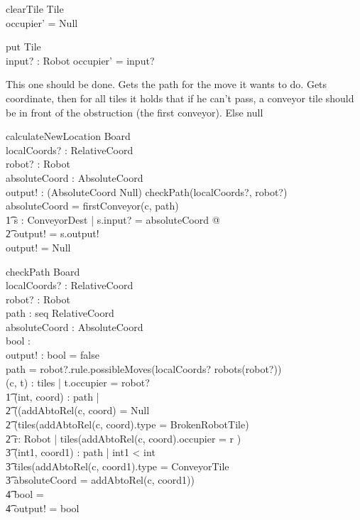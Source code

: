 \documentclass[a4paper,11pt]{article}
\begin{document}
\begin{schema}{clearTile}
\Delta Tile \\
\where
occupier' = Null
\end{schema}

\begin{schema}{put}
\Delta Tile \\
input? : Robot
\where
occupier' = input?
\end{schema}

This one should be done. Gets the path for the move it wants to do. Gets coordinate, then for all tiles it holds that if he can't pass, a conveyor tile should be in front of the obstruction (the first conveyor). Else null
\begin{schema}{calculateNewLocation}
\Xi Board \\
localCoords? : RelativeCoord \\
robot? : Robot \\
absoluteCoord : AbsoluteCoord \\
output! : (AbsoluteCoord \union Null) 
\where
\IF checkPath(localCoords?, robot?) \\
\THEN absoluteCoord = firstConveyor(c, path) \\ \t1
\exists s : ConveyorDest | s.input? = absoluteCoord @ \\ \t2
output! = s.output! \\
\ELSE output! = Null
\end{schema}

\begin{schema}{checkPath}
\Xi Board \\
localCoords? : RelativeCoord \\
robot? : Robot \\
path : seq RelativeCoord \\
absoluteCoord : AbsoluteCoord \\
bool : \bool \\
output! : \bool
\where
bool = false \\
path = robot?.rule.possibleMoves(localCoords? \cross robots(robot?)) \\
\exists (c, t) : tiles | t.occupier = robot? \implies \\ \t1
\forall (int, coord) : path | \\ \t2
((addAbtoRel(c, coord) = Null \vee \\ \t2
(tiles(addAbtoRel(c, coord).type = BrokenRobotTile) \vee \\ \t2
\exists r: Robot | tiles(addAbtoRel(c, coord).occupier = r )\implies \\ \t3
\exists (int1, coord1) : path | int1 < int \\ \t3
tiles(addAbtoRel(c, coord1).type = ConveyorTile \\ \t3
absoluteCoord = addAbtoRel(c, coord1)) \implies \\ \t4
bool = \true \\ \t4
output! = bool
\end{schema}
\end{document}
